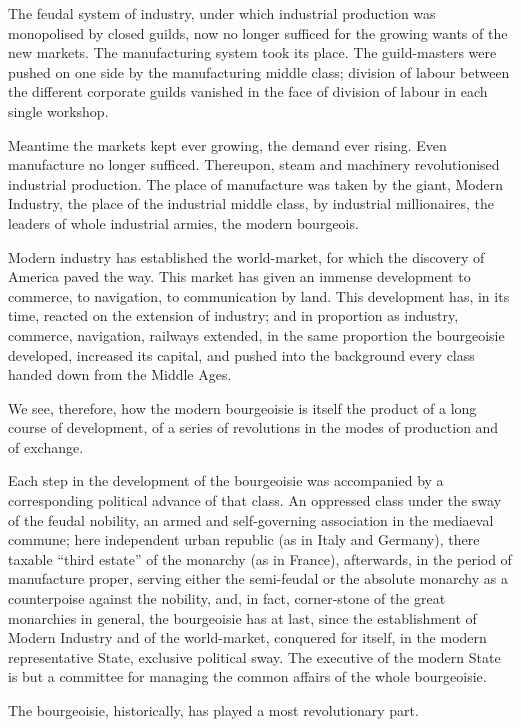 The feudal system of industry, under which industrial production was
monopolised by closed guilds, now no longer sufficed for the growing
wants of the new markets. The manufacturing system took its place. The
guild-masters were pushed on one side by the manufacturing middle
class; division of labour between the different corporate guilds
vanished in the face of division of labour in each single workshop.

Meantime the markets kept ever growing, the demand ever rising. Even
manufacture no longer sufficed. Thereupon, steam and machinery
revolutionised industrial production. The place of manufacture was
taken by the giant, Modern Industry, the place of the industrial middle
class, by industrial millionaires, the leaders of whole industrial
armies, the modern bourgeois.

Modern industry has established the world-market, for which the
discovery of America paved the way. This market has given an immense
development to commerce, to navigation, to communication by land. This
development has, in its time, reacted on the extension of industry; and
in proportion as industry, commerce, navigation, railways extended, in
the same proportion the bourgeoisie developed, increased its capital,
and pushed into the background every class handed down from the Middle
Ages.

We see, therefore, how the modern bourgeoisie is itself the product of
a long course of development, of a series of revolutions in the modes
of production and of exchange.

Each step in the development of the bourgeoisie was accompanied by a
corresponding political advance of that class. An oppressed class under
the sway of the feudal nobility, an armed and self-governing
association in the mediaeval commune; here independent urban republic
(as in Italy and Germany), there taxable “third estate” of the monarchy
(as in France), afterwards, in the period of manufacture proper,
serving either the semi-feudal or the absolute monarchy as a
counterpoise against the nobility, and, in fact, corner-stone of the
great monarchies in general, the bourgeoisie has at last, since the
establishment of Modern Industry and of the world-market, conquered for
itself, in the modern representative State, exclusive political sway.
The executive of the modern State is but a committee for managing the
common affairs of the whole bourgeoisie.

The bourgeoisie, historically, has played a most revolutionary part.

